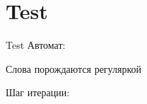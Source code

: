 \section{Test}
\begin{frame}{Test}
    Автомат:


    Слова порождаются регуляркой

    Шаг итерации:


\end{frame}
